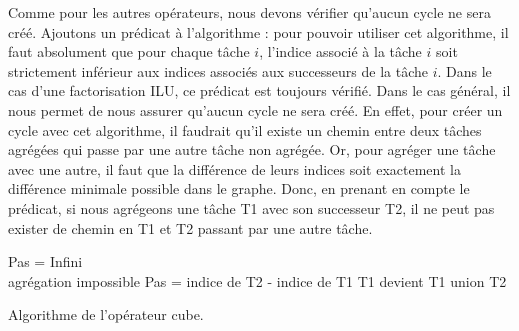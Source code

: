 Comme pour les autres opérateurs, nous devons vérifier qu'aucun cycle ne sera créé.
%
Ajoutons un prédicat à l'algorithme : pour pouvoir utiliser cet algorithme, il faut absolument que pour chaque tâche $i$, l'indice associé à la tâche $i$ soit strictement inférieur aux indices associés aux successeurs de la tâche $i$.
%
Dans le cas d'une factorisation ILU, ce prédicat est toujours vérifié.
%
Dans le cas général, il nous permet de nous assurer qu'aucun cycle ne sera créé.
%
En effet, pour créer un cycle avec cet algorithme, il faudrait qu'il existe un chemin entre deux tâches agrégées qui passe par une autre tâche non agrégée.
%
Or, pour agréger une tâche avec une autre, il faut que la différence de leurs indices soit exactement la différence minimale possible dans le graphe.
%
Donc, en prenant en compte le prédicat, si nous agrégeons une tâche T1 avec son successeur T2, il ne peut pas exister de chemin en T1 et T2 passant par une autre tâche.

\begin{algorithm}
  {\sc Pas} = Infini \\
   {
     {
       {
        \Return agrégation impossible
      }
       {
        {\sc Pas} = indice de {\sc T2} - indice de {\sc T1}
      }
    }
  }
   {
     {
       {
        {\sc T1} devient {\sc T1} union {\sc T2}
      }
    }
  }
  \caption{Algorithme de l'opérateur cube.}
  \label{algo:algo_C}
\end{algorithm}
